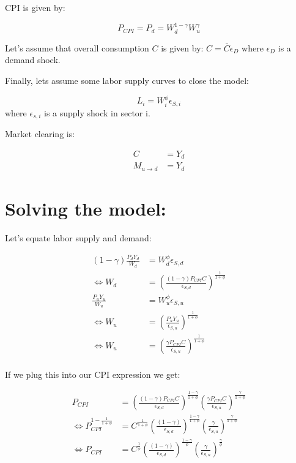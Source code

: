\documentclass[12pt,english]{article}
\begin{document}
CPI is given by:

\begin{equation}
	P_{CPI} = P_d = W_d^{1-\gamma}W_u^\gamma\label{eqn:CPI}
\end{equation}

Let's assume that overall consumption $C$ is given by: $C=\bar{C}\epsilon_{D}$ where $\epsilon_{D}$ is a demand shock.

Finally, lets assume some labor supply curves to close the model:

\[
	L_i = W_i^\phi\epsilon_{S,i}
\]
where $\epsilon_{s,i}$ is a supply shock in sector i. 

Market clearing is:

\begin{align*}
	C &=Y_d\\
	M_{u\rightarrow d} &= Y_d
\end{align*}

\section*{Solving the model:}

Let's equate labor supply and demand:

\begin{align*}
	(1-\gamma)\frac{P_d Y_d}{W_d}&=W_d^\phi \epsilon_{S,d}\\
	\Leftrightarrow W_d&=\left(\frac{(1-\gamma)P_{CPI}C}{\epsilon_{S,d}}\right)^{\frac{1}{1+\phi}}\\
	\frac{P_uY_u}{W_u} &=W_u^\phi \epsilon_{S,u}\\
	\Leftrightarrow W_u&=\left(\frac{P_uY_u}{\epsilon_{S,u}}\right)^{\frac{1}{1+\phi}}\\
	\Leftrightarrow W_u&=\left(\frac{\gamma P_{CPI}C}{\epsilon_{S,u}}\right)^{\frac{1}{1+\phi}}\\
\end{align*}



If we plug this into our CPI expression we get:

\begin{align*}
	P_{CPI} &= \left(\frac{(1-\gamma)P_{CPI}C}{\epsilon_{S,d}}\right)^{\frac{1-\gamma}{1+\phi}}\left(\frac{\gamma P_{CPI}C}{\epsilon_{S,u}}\right)^{\frac{\gamma}{1+\phi}}\\
	\Leftrightarrow P_{CPI}^{1-\frac{1}{1+\phi}}&=C^{\frac{1}{1+\phi}}\left(\frac{(1-\gamma)}{\epsilon_{S,d}}\right)^{\frac{1-\gamma}{1+\phi}}\left(\frac{\gamma}{\epsilon_{S,u}}\right)^{\frac{\gamma}{1+\phi}}\\
	\Leftrightarrow P_{CPI}&=C^{\frac{1}{\phi}}\left(\frac{(1-\gamma)}{\epsilon_{S,d}}\right)^{\frac{1-\gamma}{\phi}}\left(\frac{\gamma}{\epsilon_{S,u}}\right)^{\frac{\gamma}{\phi}}
\end{align*}
\end{document}
